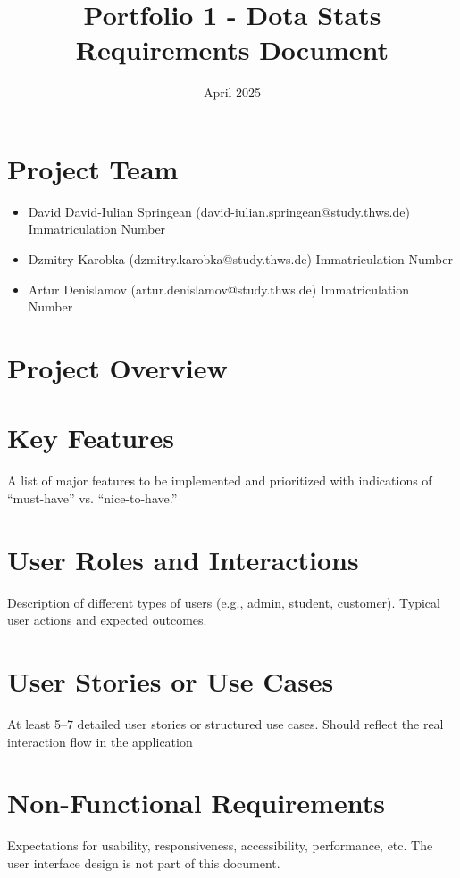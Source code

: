 \documentclass{article}
\title{Portfolio 1 - Dota Stats Requirements Document}
\date{April 2025}
\begin{document}
\maketitle

\section{Project Team}

\begin{itemize}
    \item David David-Iulian Springean (david-iulian.springean@study.thws.de) Immatriculation Number
    \item Dzmitry Karobka (dzmitry.karobka@study.thws.de) Immatriculation Number
    \item Artur Denislamov (artur.denislamov@study.thws.de) Immatriculation Number
\end{itemize}

\section{Project Overview}

\section{Key Features}
A list of major features to be implemented and prioritized with indications of “must-have” vs. “nice-to-have.”

\section{User Roles and Interactions}
Description of different types of users (e.g., admin,
student, customer). Typical user actions and expected outcomes.

\section{User Stories or Use Cases}
At least 5–7 detailed user stories or structured use cases.
Should reflect the real interaction flow in the application

\section{Non-Functional Requirements}
Expectations for usability, responsiveness, accessibility, performance, etc. The user interface design is not part of this document.
\end{document}
